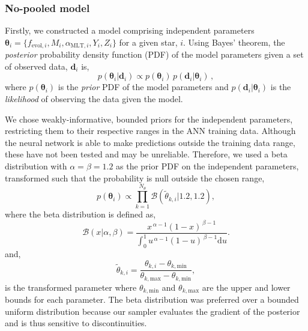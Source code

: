 \documentclass[a4paper,fleqn,usenatbib]{mnras}
\begin{document}
\subsubsection{No-pooled model}\label{sec:np}

Firstly, we constructed a model comprising independent parameters $\boldsymbol{\theta}_i = \{f_{\mathrm{evol}, i}, M_i, \alpha_{\mathrm{MLT},i}, Y_i, Z_i\}$ for a given star, $i$. Using Bayes' theorem, the \emph{posterior} probability density function (PDF) of the model parameters given a set of observed data, $\boldsymbol{d}_i$ is,
%
\begin{equation}
    p(\boldsymbol{\theta}_i | \boldsymbol{d}_i) \propto p(\boldsymbol{\theta}_i) \, p(\boldsymbol{d}_i | \boldsymbol{\theta}_i)\,,
    \label{eq:bayes}
\end{equation}
%
where $p(\boldsymbol{\theta}_i)$ is the \emph{prior} PDF of the model parameters and $p(\boldsymbol{d}_i | \boldsymbol{\theta}_i)$ is the \emph{likelihood} of observing the data given the model.

We chose weakly-informative, bounded priors for the independent parameters, restricting them to their respective ranges in the ANN training data. Although the neural network is able to make predictions outside the training data range, these have not been tested and may be unreliable. Therefore, we used a beta distribution with $\alpha = \beta = 1.2$ as the prior PDF on the independent parameters, transformed such that the probability is null outside the chosen range,
%
\begin{equation}
    p(\boldsymbol{\theta}_i) \propto \prod_{k=1}^{N_{\theta}} \mathcal{B}\left(\tilde{\theta}_{k, i} | 1.2, 1.2\right),
\end{equation}
%
where the beta distribution is defined as,
%
\begin{equation}
    \mathcal{B}(x | \alpha, \beta) = \frac{x^{\,\alpha-1}(1-x)^{\,\beta-1}}{\int_{0}^{1} u^{\,\alpha-1}(1-u)^{\,\beta-1} \mathrm{d} u}.
\end{equation}
%
and,
\begin{equation}
    \tilde{\theta}_{k, i} = \frac{\theta_{k, i} - \theta_{k, \mathrm{min}}}{\theta_{k, \mathrm{max}} - \theta_{k, \mathrm{min}}},
\end{equation}
is the transformed parameter where $\theta_{k, \mathrm{min}}$ and $\theta_{k, \mathrm{max}}$ are the upper and lower bounds for each parameter. The beta distribution was preferred over a bounded uniform distribution because our sampler evaluates the gradient of the posterior and is thus sensitive to discontinuities. 
\end{document}
